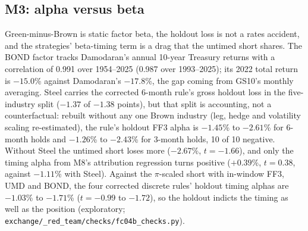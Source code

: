 \subsection{M3: alpha versus beta}
\label{app:m3}
Green-minus-Brown is static factor beta, the holdout loss is not a rates accident, and the strategies' beta-timing term is a drag that the untimed short shares. The BOND factor tracks Damodaran's annual 10-year Treasury returns with a correlation of 0.991 over 1954--2025 (0.987 over 1993--2025); its 2022 total return is $-15.0$\% against Damodaran's $-17.8$\%, the gap coming from GS10's monthly averaging. Steel carries the corrected 6-month rule's gross holdout loss in the five-industry split ($-1.37$ of $-1.38$ points), but that split is accounting, not a counterfactual: rebuilt without any one Brown industry (leg, hedge and volatility scaling re-estimated), the rule's holdout FF3 alpha is $-1.45$\% to $-2.61$\% for 6-month holds and $-1.26$\% to $-2.43$\% for 3-month holds, 10 of 10 negative. Without Steel the untimed short loses more ($-2.67$\%, $t=-1.66$), and only the timing alpha from M8's attribution regression turns positive ($+0.39$\%, $t=0.38$, against $-1.11$\% with Steel). Against the $\pi$-scaled short with in-window FF3, UMD and BOND, the four corrected discrete rules' holdout timing alphas are $-1.03$\% to $-1.71$\% ($t=-0.99$ to $-1.72$), so the holdout indicts the timing as well as the position (exploratory; \texttt{exchange/\_red\_team/\allowbreak checks/\allowbreak fc04b\_checks.py}).

